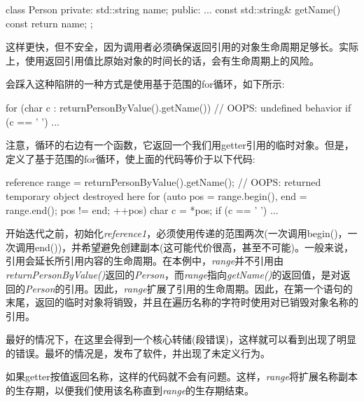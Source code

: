 \begin{codebox}[cpp]
class Person
{
private:
  std::string name;
public:
  ...
  const std::string& getName() const {
    return name;
  }
};
\end{codebox}

这样更快，但不安全，因为调用者必须确保返回引用的对象生命周期足够长。实际上，使用返回引用值比原始对象的时间长的话，会有生命周期上的风险。\par

会踩入这种陷阱的一种方式是使用基于范围的for循环，如下所示:\par

\begin{codebox}[cpp]
for (char c : returnPersonByValue().getName()) { // OOPS: undefined behavior
  if (c == ' ') {
    ...
  }
}
\end{codebox}

注意，循环的右边有一个函数，它返回一个我们用getter引用的临时对象。但是，定义了基于范围的for循环，使上面的代码等价于以下代码:\par

\begin{codebox}[cpp]
reference range = returnPersonByValue().getName();
// OOPS: returned temporary object destroyed here
for (auto pos = range.begin(), end = range.end(); pos != end; ++pos) {
  char c = *pos;
  if (c == ' ') {
    ...
  }
}
\end{codebox}

开始迭代之前，初始化\textit{reference1}，必须使用传递的范围两次(一次调用begin()，一次调用end())，并希望避免创建副本(这可能代价很高，甚至不可能)。一般来说，引用会延长所引用内容的生命周期。在本例中，\textit{range}并不引用由\textit{returnPersonByValue(\allowbreak{})\allowbreak{}}返回的\textit{Person}，而\textit{range}指向\textit{getName()}的返回值，是对返回的\textit{Person}的引用。因此，\textit{range}扩展了引用的生命周期。因此，在第一个语句的末尾，返回的临时对象将销毁，并且在遍历名称的字符时使用对已销毁对象名称的引用。\par

最好的情况下，在这里会得到一个核心转储(段错误)，这样就可以看到出现了明显的错误。最坏的情况是，发布了软件，并出现了未定义行为。\par

如果getter按值返回名称，这样的代码就不会有问题。这样，\textit{range}将扩展名称副本的生存期，以便我们使用该名称直到\textit{range}的生存期结束。\par


